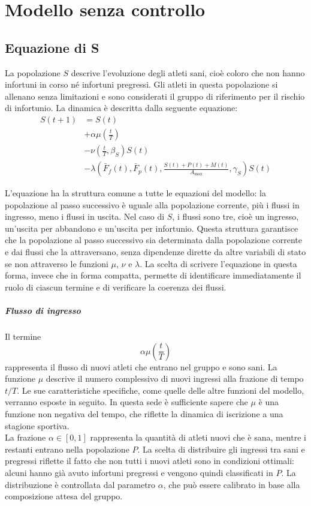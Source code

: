 \chapter{Modello senza controllo}

\section{Equazione di S}

La popolazione $S$ descrive l'evoluzione degli atleti sani, cioè coloro che non hanno infortuni in corso né infortuni pregressi. Gli atleti in questa popolazione si allenano senza limitazioni e sono considerati il gruppo di riferimento per il rischio di infortunio. La dinamica è descritta dalla seguente equazione:
\begin{align*}
    S(t+1) &= S(t) \\
        &+ \alpha \mu\left(\frac{t}{T}\right) \\
        &- \nu\left(\frac{t}{T}, \beta_S\right) S(t) \\
        &- \lambda\left(\bar{F}_f(t), \bar{F}_p(t), \frac{S(t) + P(t) + M(t)}{A_{\max}}, \gamma_S\right) S(t)
\end{align*}

L'equazione ha la struttura comune a tutte le equazioni del modello: la popolazione al passo successivo è uguale alla popolazione corrente, più i flussi in ingresso, meno i flussi in uscita. Nel caso di $S$, i flussi sono tre, cioè un ingresso, un'uscita per abbandono e un'uscita per infortunio. Questa struttura garantisce che la popolazione al passo successivo sia determinata dalla popolazione corrente e dai flussi che la attraversano, senza dipendenze dirette da altre variabili di stato se non attraverso le funzioni $\mu$, $\nu$ e $\lambda$. La scelta di scrivere l'equazione in questa forma, invece che in forma compatta, permette di identificare immediatamente il ruolo di ciascun termine e di verificare la coerenza dei flussi.

\paragraph{Flusso di ingresso}
Il termine
\[
    \alpha \mu\left(\frac{t}{T}\right)
\]
rappresenta il flusso di nuovi atleti che entrano nel gruppo e sono sani. La funzione $\mu$ descrive il numero complessivo di nuovi ingressi alla frazione di tempo $t/T$. Le sue caratteristiche specifiche, come quelle delle altre funzioni del modello, verranno esposte in seguito. In questa sede è sufficiente sapere che $\mu$ è una funzione non negativa del tempo, che riflette la dinamica di iscrizione a una stagione sportiva. \\
La frazione $\alpha \in [0,1]$ rappresenta la quantità di atleti nuovi che è sana, mentre i restanti entrano nella popolazione $P$. La scelta di distribuire gli ingressi tra sani e pregressi riflette il fatto che non tutti i nuovi atleti sono in condizioni ottimali: alcuni hanno già avuto infortuni pregressi e vengono quindi classificati in $P$. La distribuzione è controllata dal parametro $\alpha$, che può essere calibrato in base alla composizione attesa del gruppo. \par

